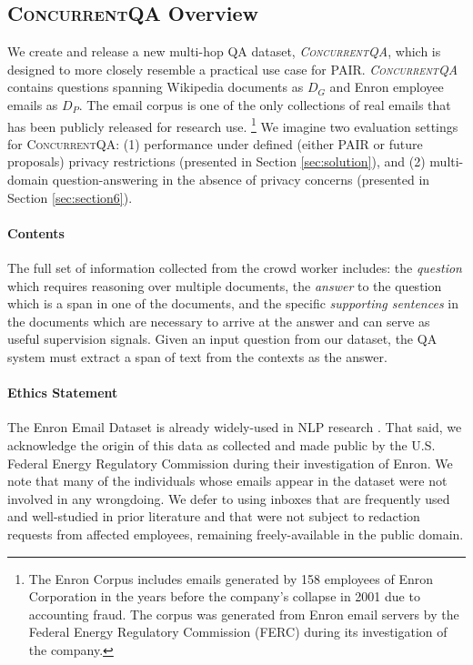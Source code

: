 \documentclass{article}
\renewcommand\cite{\citep}	\newcommand\shortcite{\citeyearpar}\newcommand\newcite{\citet}
\newcommand{\datasetname}{\textsc{ConcurrentQA}\xspace}
\newcommand{\problemshortname}{\textsc{PAIR}\xspace}
\begin{document}
\subsection{\datasetname Overview} 
We create and release a new multi-hop QA dataset, \textit{\datasetname}, which is designed to more closely resemble a practical use case for \problemshortname. \textit{\datasetname} contains 
questions spanning Wikipedia documents as $D_G$ and Enron employee emails \cite{klimt2004enron} as $D_P$. The email corpus is one of the only collections of real emails that has been publicly released for research use. \footnote{The Enron Corpus includes emails generated by 158 employees of Enron Corporation in the years before the company's collapse in 2001 due to accounting fraud. The corpus was generated from Enron email servers by the Federal Energy Regulatory Commission (FERC) during its investigation of the company.} We imagine two evaluation settings for \datasetname: (1) performance under defined (either \problemshortname or future proposals) privacy restrictions (presented in Section \ref{sec:solution}), and (2) 
multi-domain question-answering in the absence of privacy concerns
(presented in Section \ref{sec:section6}). 


\paragraph{Contents} The full set of information collected from the crowd worker includes: the \textit{question} which requires reasoning over multiple documents, the \textit{answer} to the question which is a span in one of the documents, and the specific \textit{supporting sentences} in the documents which are necessary to arrive at the answer and can serve as useful supervision signals. Given an input question from our dataset, the QA system must extract a span of text from the contexts as the answer. 

\paragraph{Ethics Statement} The Enron Email Dataset is already widely-used in NLP research \cite{heller2017enronnyt}. That said, we acknowledge the origin of this data as collected and made public by the U.S. Federal Energy Regulatory Commission during their investigation of Enron. We note that many of the individuals whose emails appear in the dataset were not involved in any wrongdoing. We defer to using inboxes that are frequently used and well-studied in prior literature and that were not subject to redaction requests from affected employees, remaining freely-available in the public domain.
\end{document}
